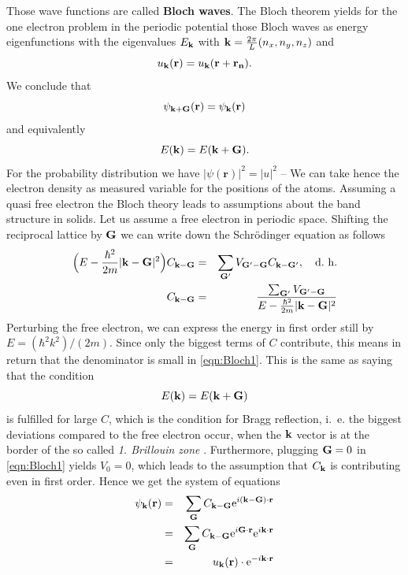 Those wave functions are called \textbf{Bloch waves}.
The Bloch theorem yields for the one electron problem in the periodic potential those Bloch waves 
as energy eigenfunctions with the eigenvalues
$E_{\mathbf{k}}$ with $\mathbf{k} = \frac{2 \pi}{L} (n_x, n_y, n_z)$ and
\begin{equation}
    u_{\mathbf{k}}(\mathbf{r}) = u_{\mathbf{k}}(\mathbf{r + r_n}) .
\end{equation}
We conclude that
\begin{equation}
    \psi_{\mathbf{k} + \mathbf{G}}(\mathbf{r}) = \psi_{\mathbf{k}}(\mathbf{r}) 
\end{equation}
and equivalently 
\begin{equation}
    E(\mathbf{k}) = E(\mathbf{k} + \mathbf{G}).
\end{equation}
For the probability distribution we have $|\psi(\mathbf{r})|^2 = |u|^2$ --  
We can take hence the electron density as measured variable for the positions of the atoms.
Assuming a quasi free electron the Bloch theory leads to assumptions about the band structure in solids.
Let us assume a free electron in periodic space. Shifting the reciprocal lattice by $\mathbf{G}$ we can
write down the Schrödinger equation as follows
\begin{eqnarray}
    \Big(E - \frac{\hbar^2}{2m}|\mathbf{k} - \mathbf{G}|^2\Big) C_{\mathbf{k} - \mathbf{G}} &=&
        \sum_{\mathbf{G}'} V_\mathbf{G' - G} C_{\mathbf{k} - \mathbf{G}'}, \quad \mathrm{d.\ h.} \nonumber \\
    \label{eqn:Bloch1}    
    C_{\mathbf{k} - \mathbf{G}} &=& \frac{ \sum_{\mathbf{G}'} V_\mathbf{G' - G}}{E - \frac{\hbar^2}{2m}|\mathbf{k} - \mathbf{G}|^2} 
\end{eqnarray}
Perturbing the free electron, we can express the energy in first order still by
$E = (\hbar^2 k^2) / (2m)$. Since only the biggest terms of $C$ contribute, this
means in return that the denominator is small in \eqref{eqn:Bloch1}. This is the same
as saying that the condition
\begin{equation}
    E(\mathbf{k}) = E(\mathbf{k} + \mathbf{G})
\end{equation}
is fulfilled for large $C$, which is the condition for Bragg reflection, i.~e. the biggest 
deviations compared to the free electron occur, when the $\mathbf{k}$ vector is at the border of the
so called \emph{1. Brillouin zone} .
Furthermore, plugging $\mathbf{G} = 0$ in \eqref{eqn:Bloch1} yields $V_0 = 0$, which leads to the assumption that
$C_{\mathbf{k}}$ is contributing even in first order. Hence we get the system of equations 
\begin{eqnarray}
    \psi_{\mathbf{k}}(\mathbf{r})&=& \sum_{\mathbf{G}} C_{\mathbf{k} - \mathbf{G}} \mathrm{e}^{i(\mathbf{k} - \mathbf{G}) \cdot \mathbf{r}} \nonumber \\
            &=& \sum_{\mathbf{G}} C_{\mathbf{k} - \mathbf{G}} \mathrm{e}^{i \mathbf{G} \cdot \mathbf{r}}  \mathrm{e}^{i\mathbf{k} \cdot \mathbf{r}} \nonumber \\
            &=& u_{\mathbf{k}}(\mathbf{r}) \cdot \mathrm{e}^{-i\mathbf{k} \cdot \mathbf{r}}
\end{eqnarray}
